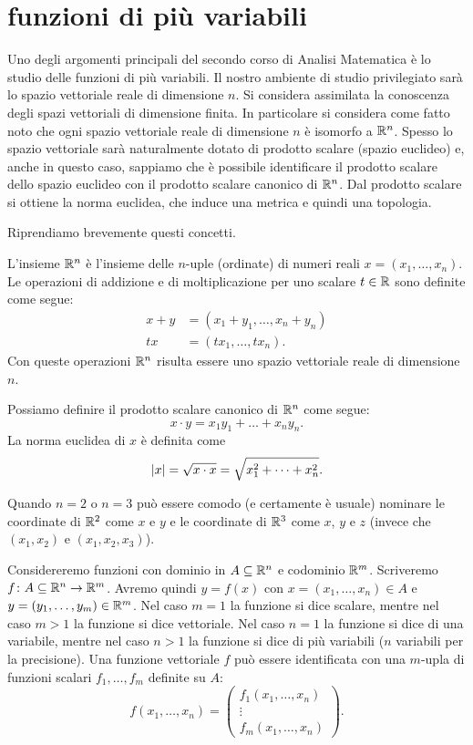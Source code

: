 \section{funzioni di più variabili}

Uno degli argomenti principali del secondo corso di Analisi Matematica è lo studio 
delle funzioni di più variabili. 
Il nostro ambiente di studio privilegiato sarà 
lo spazio vettoriale reale di dimensione $n$. 
Si considera assimilata la conoscenza degli spazi vettoriali di dimensione 
finita. 
In particolare si considera come fatto noto che ogni spazio 
vettoriale reale di dimensione $n$ è isomorfo a ${\mathbb R}^n$. 
Spesso lo spazio vettoriale sarà naturalmente dotato di prodotto scalare (spazio euclideo) e,
anche in questo caso, sappiamo che è possibile identificare il prodotto scalare 
dello spazio euclideo con il prodotto scalare canonico di ${\mathbb R}^n$.
Dal prodotto scalare si ottiene la norma euclidea, che induce una metrica e quindi una topologia.

Riprendiamo brevemente questi concetti.
\begin{definition}
L'insieme ${\mathbb R}^n$ è l'insieme delle $n$-uple (ordinate) di numeri reali 
$ x = (x_1,\dots,x_n)$.
Le operazioni di addizione e di moltiplicazione per uno scalare $t\in {\mathbb R}$
sono definite come segue:
\begin{align*}
 x +  y &= (x_1+y_1,\dots,x_n+y_n)\\
t  x &= (t x_1,\dots,t x_n).
\end{align*}
Con queste operazioni ${\mathbb R}^n$ risulta essere uno spazio vettoriale reale di dimensione $n$.

Possiamo definire il prodotto scalare canonico di ${\mathbb R}^n$ come segue:
\[
 x \cdot  y = x_1 y_1 + \dots + x_n y_n.
\]
La norma euclidea di $ x$ è definita come
\[
{\left| x\right|} = \sqrt{ x\cdot  x} = \sqrt{x_1^2 + \dots + x_n^2}.
\]
\end{definition}

Quando $n=2$ o $n=3$ può essere comodo (e certamente è usuale) nominare 
le coordinate di ${\mathbb R}^2$ come $x$ e $y$ e le coordinate di ${\mathbb R}^3$ come $x$, $y$ e $z$
(invece che $(x_1,x_2)$ e $(x_1,x_2,x_3)$).

Considereremo funzioni con dominio in $A\subseteq {\mathbb R}^n$ e codominio ${\mathbb R}^m$. 
Scriveremo $ f\colon A \subseteq {\mathbb R}^n \to {\mathbb R}^m$.
Avremo quindi $ y =  f( x)$ con $ x =(x_1,\dots,x_n)\in A$ e $ y = (y_1,\dots,y_m)\in {\mathbb R}^m$.
Nel caso $m=1$ la funzione si dice scalare, 
mentre nel caso $m>1$ la funzione si dice vettoriale.
Nel caso $n=1$ la funzione si dice di una variabile, 
mentre nel caso $n>1$ la funzione si dice di 
più variabili ($n$ variabili per la precisione).
Una funzione vettoriale $ f$ può essere identificata con una 
$m$-upla di funzioni scalari $f_1,\dots,f_m$ definite su $A$:
\[
   f(x_1, \dots, x_n) = \begin{pmatrix}
    f_1(x_1,\dots, x_n) \\
    \vdots \\
    f_m(x_1,\dots, x_n)
  \end{pmatrix}.
\]

